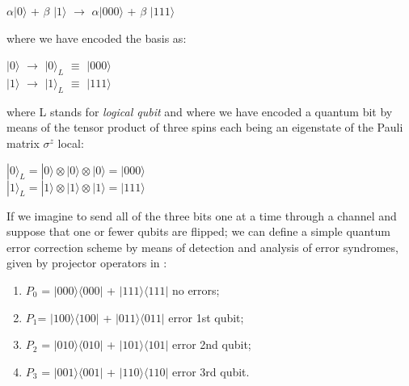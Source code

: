 \documentclass{Configuration_Files/PoliMi3i_thesis}
\begin{document}
\begin{center}
	$\alpha |0 \rangle$ + $\beta$ $|1 \rangle$ $\rightarrow$ $\alpha |000 \rangle$ + $\beta$ $|111 \rangle$
\end{center}

where we have encoded the basis as:

\begin{center}
	$|0 \rangle$ $\rightarrow$ $|0 \rangle_L$ $\equiv$ $|000 \rangle$   \\
	$|1 \rangle$ $\rightarrow$ $|1 \rangle_L$ $\equiv$ $|111 \rangle$
\end{center}

where L stands for {\it logical qubit} and where we have encoded a quantum bit by means of the tensor product of three spins each being an eigenstate of the Pauli matrix $\sigma^z$ local: 

\begin{center}
	$|0\rangle_L = |0\rangle \otimes |0\rangle \otimes |0\rangle = |000\rangle$ \\
	$|1\rangle_L = |1\rangle \otimes |1\rangle \otimes |1\rangle = |111\rangle$
\end{center}

If we imagine to send all of the three bits one at a time through a channel and suppose that one or fewer qubits are flipped; we can define a simple quantum error correction scheme by means of detection and analysis of error syndromes, given by projector operators in \cite{Nie06}:

\begin{enumerate}
	\item  $P_0$ = $|000 \rangle \langle 000|$ + $|111 \rangle \langle 111|$ no errors;
	\item $P_1$= $|100 \rangle \langle 100|$ + $|011 \rangle \langle 011|$ error 1st qubit;
	\item $P_2$ = $|010 \rangle \langle 010|$ + $|101 \rangle \langle 101|$ error 2nd qubit;
	\item $P_3$ = $|001 \rangle \langle 001|$ + $|110 \rangle \langle 110|$ error 3rd qubit.
\end{enumerate}
\end{document}
